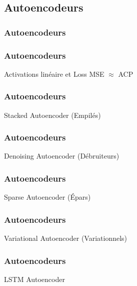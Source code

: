 \subsection{Autoencodeurs}

\begin{frame}
  \frametitle{Autoencodeurs}
\end{frame}

\begin{frame}
  \frametitle{Autoencodeurs}
  Activations linéaire et Loss MSE $\approx$ ACP
\end{frame}

\begin{frame}
  \frametitle{Autoencodeurs}
  Stacked Autoencoder (Empilés)
\end{frame}

\begin{frame}
  \frametitle{Autoencodeurs}
  Denoising Autoencoder (Débruiteurs)
\end{frame}

\begin{frame}
  \frametitle{Autoencodeurs}
  Sparse Autoencoder (Épars)
\end{frame}

\begin{frame}
  \frametitle{Autoencodeurs}
  Variational Autoencoder (Variationnels)
\end{frame}

\begin{frame}
  \frametitle{Autoencodeurs}
  LSTM Autoencoder
\end{frame}
